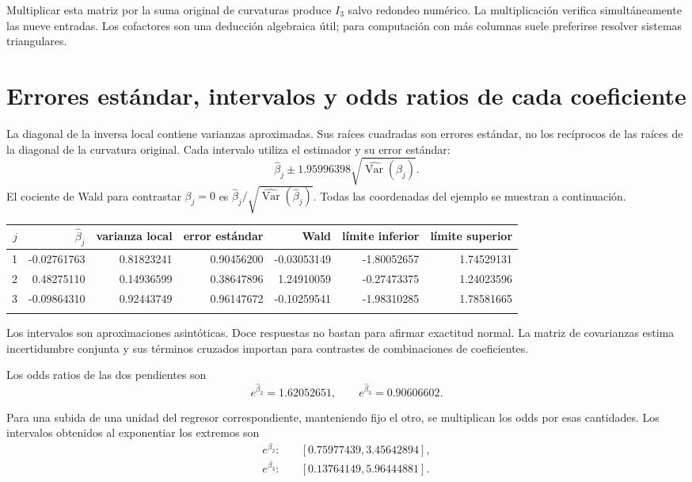 \documentclass[11pt,a4paper]{article}
\DeclareMathOperator{\Var}{Var}
\begin{document}
Multiplicar esta matriz por la suma original de curvaturas
produce \(I_3\) salvo redondeo numérico.
La multiplicación verifica simultáneamente las nueve entradas.
Los cofactores son una deducción algebraica útil;
para computación con más columnas suele preferirse
resolver sistemas triangulares.

\clearpage
\section{Errores estándar, intervalos y odds ratios de cada coeficiente}\label{logit109}
La diagonal de la inversa local contiene varianzas aproximadas.
Sus raíces cuadradas son errores estándar,
no los recíprocos de las raíces de la diagonal
de la curvatura original.
Cada intervalo utiliza el estimador y su error estándar:
\[
\widehat\beta_j\pm1.95996398
\sqrt{\widehat{\Var}(\widehat\beta_j)}.
\]
El cociente de Wald para contrastar \(\beta_j=0\)
es \(\widehat\beta_j/\sqrt{\widehat{\Var}(\widehat\beta_j)}\).
Todas las coordenadas del ejemplo se muestran a continuación.
\begin{center}\scriptsize
\begin{tabular}{rrrrrrr}\toprule
\(j\)&\(\widehat\beta_j\)&varianza local&error estándar&Wald&límite inferior&límite superior\\\midrule
1&-0.02761763&0.81823241&0.90456200&-0.03053149&-1.80052657&1.74529131\\
2&0.48275110&0.14936599&0.38647896&1.24910059&-0.27473375&1.24023596\\
3&-0.09864310&0.92443749&0.96147672&-0.10259541&-1.98310285&1.78581665\\
\\\bottomrule\end{tabular}\end{center}
Los intervalos son aproximaciones asintóticas.
Doce respuestas no bastan para afirmar exactitud normal.
La matriz de covarianzas estima incertidumbre conjunta
y sus términos cruzados importan para contrastes
de combinaciones de coeficientes.

Los odds ratios de las dos pendientes son
\[
e^{\widehat\beta_2}=1.62052651,\qquad e^{\widehat\beta_3}=0.90606602.
\]

Para una subida de una unidad del regresor correspondiente,
manteniendo fijo el otro, se multiplican los odds
por esas cantidades.
Los intervalos obtenidos al exponentiar los extremos son
\[
\begin{aligned}
e^{\beta_2}:&\quad[0.75977439,3.45642894],\\e^{\beta_3}:&\quad[0.13764149,5.96444881].\end{aligned}
\]
\end{document}
